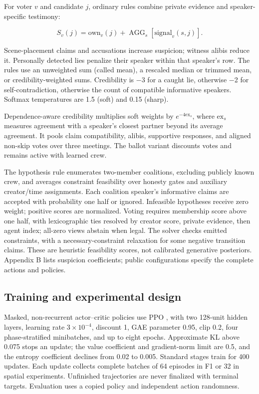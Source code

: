\documentclass[
  12pt,
]{article}
\begin{document}
For voter \(v\) and candidate \(j\), ordinary rules combine private
evidence and speaker-specific testimony:

\[
S_v(j)=\mathrm{own}_v(j)+\operatorname{AGG}_s[\mathrm{signal}_v(s,j)].
\]

Scene-placement claims and accusations increase suspicion; witness
alibis reduce it. Personally detected lies penalize their speaker within
that speaker's row. The rules use an unweighted sum (called mean), a
rescaled median or trimmed mean, or credibility-weighted sums.
Credibility is −3 for a caught lie, otherwise −2 for self-contradiction,
otherwise the count of compatible informative speakers. Softmax
temperatures are 1.5 (soft) and 0.15 (sharp).

Dependence-aware credibility multiplies soft weights by
\(e^{-4\mathrm{ex}_s}\), where \(\mathrm{ex}_s\) measures agreement with
a speaker's closest partner beyond its average agreement. It pools claim
compatibility, alibis, supportive responses, and aligned non-skip votes
over three meetings. The ballot variant discounts votes and remains
active with learned crew.

The hypothesis rule enumerates two-member coalitions, excluding publicly
known crew, and averages constraint feasibility over honesty gates and
auxiliary creator/time assignments. Each coalition speaker's informative
claims are accepted with probability one half or ignored. Infeasible
hypotheses receive zero weight; positive scores are normalized. Voting
requires membership score above one half, with lexicographic ties
resolved by creator score, private evidence, then agent index; all-zero
views abstain when legal. The solver checks emitted constraints, with a
necessary-constraint relaxation for some negative transition claims.
These are heuristic feasibility scores, not calibrated generative
posteriors. Appendix B lists suspicion coefficients; public
configurations specify the complete actions and policies.

\FloatBarrier

\subsection{Training and experimental
design}\label{training-and-experimental-design}

Masked, non-recurrent actor--critic policies use PPO
,
 with two 128-unit hidden layers,
learning rate \(3\times10^{-4}\), discount 1, GAE parameter 0.95, clip
0.2, four phase-stratified minibatches, and up to eight epochs.
Approximate KL above 0.075 stops an update; the value coefficient and
gradient-norm limit are 0.5, and the entropy coefficient declines from
0.02 to 0.005. Standard stages train for 400 updates. Each update
collects complete batches of 64 episodes in F1 or 32 in spatial
experiments. Unfinished trajectories are never finalized with terminal
targets. Evaluation uses a copied policy and independent action
randomness.
\end{document}

